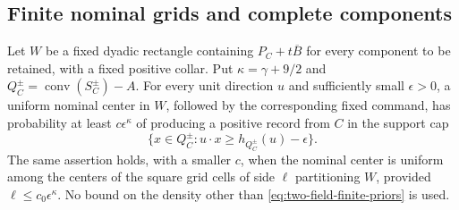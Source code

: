 \subsection{Finite nominal grids and complete components}
\begin{lemma}
\label{lem:two-field-grid-details}
Let $W$ be a fixed dyadic rectangle containing
$P_C+t\overline B$ for every component to be retained, with a
fixed positive collar.  Put
$\kappa=\gamma+9/2$ and
$Q_C^\pm=\operatorname{conv}(S_C^\pm)-A$.
For every unit direction $u$ and sufficiently small $\epsilon>0$,
a uniform nominal center in $W$, followed by the corresponding
fixed command, has probability at least $c\epsilon^\kappa$ of
producing a positive record from $C$ in the support cap
\[
 \{x\in Q_C^\pm:
       u\cdot x\ge h_{Q_C^\pm}(u)-\epsilon\}.
\]
The same assertion holds, with a smaller $c$, when the nominal center
is uniform among the centers of the square grid cells of side
$\ell$ partitioning $W$, provided
$\ell\le c_0\epsilon^\kappa$.  No bound on the density other
than \eqref{eq:two-field-finite-priors} is used.
\end{lemma}
